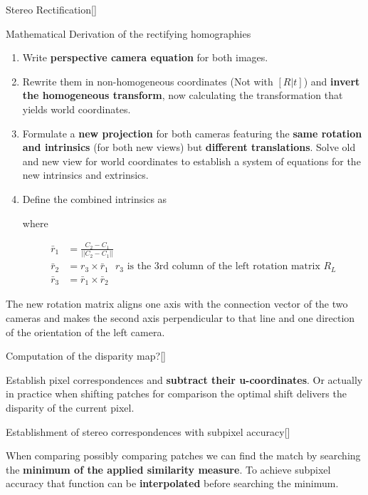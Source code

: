 \documentclass[10pt,a4paper]{scrartcl}
\begin{document}
\begin{multicols*}{2}
\begin{QandA}
{Stereo Rectification}[\Derivation]
\item Mathematical Derivation of the rectifying homographies
\begin{enumerate}
\item Write \textbf{perspective camera equation} for both images.
\item Rewrite them in non-homogeneous coordinates (Not with $[R|t]$) and \textbf{invert the homogeneous transform}, now calculating the transformation that yields world coordinates.
\item Formulate a \textbf{new projection} for both cameras featuring the \textbf{same rotation and intrinsics} (for both new views) but \textbf{different translations}. Solve old and new view for world coordinates to establish a system of equations for the new intrinsics and extrinsics.
\item Define the combined intrinsics as


where 

\begin{align*}
\bar{r}_1&=\frac{C_2-C_1}{||C_2-C_1||}\\
\bar{r}_2&=r_3\times\bar{r}_1\text{ $r_3$ is the 3rd column of the left rotation matrix $R_L$}\\
\bar{r}_3&=\bar{r}_1\times\bar{r}_2
\end{align*}
\end{enumerate}
\item The new rotation matrix aligns one axis with the connection vector of the two cameras and makes the second axis perpendicular to that line and one direction of the orientation of the left camera.
\end{QandA}

\begin{QandA}
{Computation of the disparity map?}[\Derivation]
\item Establish pixel correspondences and \textbf{subtract their u-coordinates}. Or actually in practice when shifting patches for comparison the optimal shift delivers the disparity of the current pixel.
\end{QandA}

\begin{QandA}
{Establishment of stereo correspondences with subpixel accuracy}[\Application]
\item When comparing possibly comparing patches we can find the match by searching the \textbf{minimum of the applied similarity measure}. To achieve subpixel accuracy that function can be \textbf{interpolated} before searching the minimum.
\end{QandA}


\end{multicols*}
\end{document}
